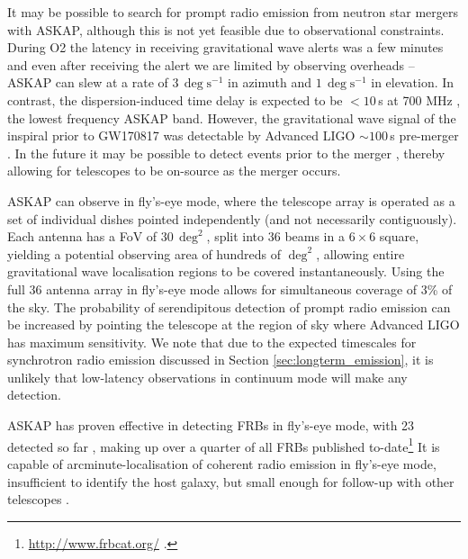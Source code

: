 It may be possible to search for prompt radio emission from neutron star mergers with ASKAP, although this is not yet feasible due to observational constraints. During O2 the latency in receiving gravitational wave alerts was a few minutes and even after receiving the alert we are limited by observing overheads -- ASKAP can slew at a rate of $3\,\deg\textrm{s}^{-1}$ in azimuth and $1\,\deg\textrm{s}^{-1}$ in elevation. In contrast, the dispersion-induced time delay is expected to be $<10\,$s at 700 MHz \citep{2016MNRAS.459..121C}, the lowest frequency ASKAP band. However, the gravitational wave signal of the inspiral prior to GW170817 was detectable by Advanced LIGO $\sim 100\,$s pre-merger \citep{2017PhRvL.119p1101A}. In the future it may be possible to detect events prior to the merger \citep{2018PhRvD..97l3014C}, thereby allowing for telescopes to be on-source as the merger occurs.

ASKAP can observe in fly's-eye mode, where the telescope array is operated as a set of individual dishes pointed independently (and not necessarily contiguously). Each antenna has a FoV of $30\,\deg^2$, split into 36 beams in a $6\times6$ square, yielding a potential observing area of hundreds of $\deg^2$, allowing entire gravitational wave localisation regions to be covered instantaneously. Using the full 36 antenna array in fly's-eye mode allows for simultaneous coverage of 3\% of the sky. The probability of serendipitous detection of prompt radio emission can be increased by pointing the telescope at the region of sky where Advanced LIGO has maximum sensitivity. We note that due to the expected timescales for synchrotron radio emission discussed in Section \ref{sec:longterm_emission}, it is unlikely that low-latency observations in continuum mode will make any detection.

\pagebreak
ASKAP has proven effective in detecting FRBs in fly's-eye mode, with 23 detected so far \citep{2017ApJ...841L..12B,2019ApJ...872L..19M,2018Natur.562..386S}, making up over a quarter of all FRBs published to-date\footnote{\url{http://www.frbcat.org/} \citep{2016PASA...33...45P}.} It is capable of arcminute-localisation of coherent radio emission in fly's-eye mode, insufficient to identify the host galaxy, but small enough for follow-up with other telescopes \citep{2018ApJ...867L..10M}. 

